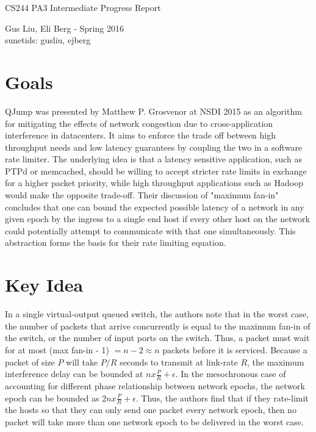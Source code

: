 \documentclass[12pt]{article}
\begin{document}
\begin{center}
{\Large CS244 PA3 Intermediate Progress Report}
\begin{center}
Gus Liu, Eli Berg - Spring 2016 \\
sunetids: gusliu, ejberg
\end{center} 
\end{center}

\section*{Goals}	
	QJump was presented by Matthew P. Grosvenor at NSDI 2015 as an algorithm for mitigating the effects of network congestion due to cross-application interference in datacenters. It aims to enforce the trade off between high throughput needs and low latency guarantees by coupling the two in a software rate limiter. The underlying idea is that a latency sensitive application, such as PTPd or memcached, should be willing to accept stricter rate limits in exchange for a higher packet priority, while high throughput applications such as Hadoop would make the opposite trade-off. Their discussion of "maximum fan-in" concludes that one can bound the expected possible latency of a network in any given epoch by the ingress to a single end host if every other host on the network could potentially attempt to communicate with that one simultaneously. This abstraction forms the basis for their rate limiting equation.
	
\section*{Key Idea}
	In a single virtual-output queued switch, the authors note that in the worst case, the number of packets that arrive concurrently is equal to the maximum fan-in of the switch, or the number of input ports on the switch. Thus, a packet must wait for at most (max fan-in - 1) $= n-2 \approx n$ packets before it is serviced. Because a packet of size $P$ will take $P/R$ seconds to transmit at link-rate $R$, the maximum interference delay can be bounded at $nx\frac{P}{R}+\epsilon$. In the mesochronous case of accounting for different phase relationship between network epochs, the network epoch can be bounded as $2nx\frac{P}{R}+\epsilon$. Thus, the authors find that if they rate-limit the hosts so that they can only send one packet every network epoch, then no packet will take more than one network epoch to be delivered in the worst case. 
\end{document}
